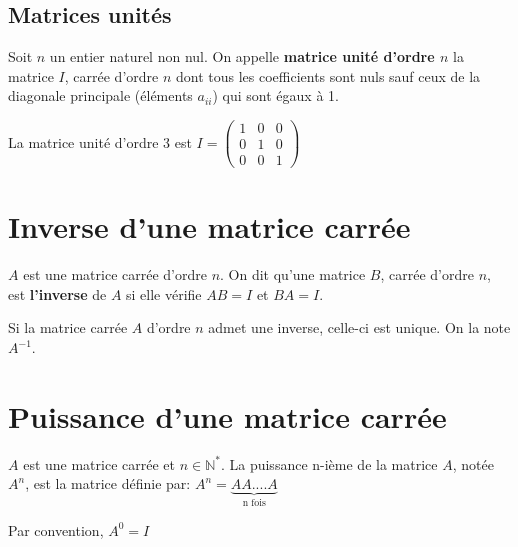 \documentclass[french]{book}
\begin{document}
\subsection{Matrices unités}
\begin{defn}
Soit $n$ un entier naturel non nul. On appelle \textbf{matrice unité d'ordre $n$} la matrice $I$, carrée d'ordre $n$ dont tous les coefficients sont nuls sauf ceux de la diagonale principale (éléments $a_{ii}$) qui sont égaux à 1.
\end{defn}

\begin{exemple}

La matrice unité d'ordre 3 est $I=\begin{pmatrix}
    1 & 0 & 0 \\ 
   0 & 1 & 0 \\
   0 & 0 & 1
   \end{pmatrix} $
  
\end{exemple}

   \section{Inverse d'une matrice carrée}
  
   \begin{defn}
   $A$ est une matrice carrée d'ordre $n$. On dit qu'une matrice $B$, carrée d'ordre $n$, est \textbf{l'inverse} de $A$ si elle vérifie $AB=I$ et $BA=I$.
	\end{defn}   
   
\begin{prop}
   
   Si la matrice carrée $A$ d'ordre $n$ admet une inverse, celle-ci est unique. On la note $A^{-1}$.
   
\end{prop}
   
 \section{Puissance d'une matrice carrée}
   \begin{defn}
   
   $A$ est une matrice carrée et $n \in \mathbb{N}^{*}$. La puissance n-ième de la matrice $A$, notée $A^{n}$, est la matrice définie par: $A^{n}=\underbrace{AA....A}_{\text{n fois}}$
   
    Par convention, $A^{0}=I$
   
  \end{defn}
  
\end{document}

